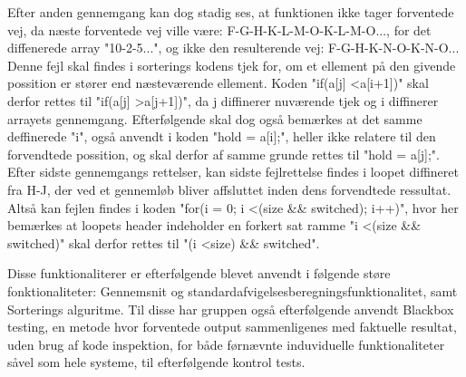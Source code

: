 \documentclass[11pt]{article}
\begin{document}
    Efter anden gennemgang kan dog stadig ses, at funktionen ikke tager forventede vej, da næste forventede vej ville være: F-G-H-K-L-M-O-K-L-M-O..., for det diffenerede array "10-2-5...", og ikke den resulterende vej: F-G-H-K-N-O-K-N-O...\\
    Denne fejl skal findes i sorterings kodens tjek for, om et ellement på den givende possition er stører end næsteværende ellement. Koden "if(a[j] \textless a[i+1])" skal derfor rettes til "if(a[j] \textgreater a[j+1])", da j diffinerer nuværende tjek og i diffinerer arrayets gennemgang. Efterfølgende skal dog også bemærkes at det samme deffinerede "i", også anvendt i koden "hold = a[i];", heller ikke relatere til den forvendtede possition, og skal derfor af samme grunde rettes til "hold = a[j];".\\
    Efter sidste gennemgangs rettelser, kan sidste fejlrettelse findes i loopet diffineret fra H-J, der ved et gennemløb bliver affsluttet inden dens forvendtede ressultat. Altså kan fejlen findes i koden "for(i = 0; i \textless (size \&\& switched); i++)", hvor her bemærkes at loopets header indeholder en forkert sat ramme "i \textless (size \&\& switched)" skal derfor rettes til "(i \textless size) \&\& switched".

    \noindent
    Disse funktionaliterer er efterfølgende blevet anvendt i følgende støre fonktionaliteter:
    Gennemsnit og standardafvigelsesberegningsfunktionalitet,
    samt Sorterings alguritme.
    Til disse har gruppen også efterfølgende anvendt Blackbox testing, en metode hvor forventede output sammenligenes med faktuelle resultat, uden brug af kode inspektion, for både førnævnte induviduelle funktionaliteter såvel som hele systeme, til efterfølgende kontrol tests.
    
\end{document}
